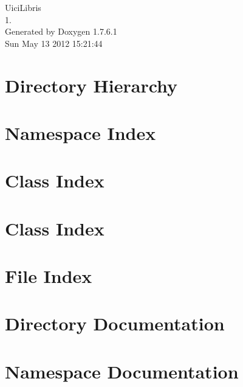 \documentclass[a4paper]{book}
\begin{document}
\hypersetup{pageanchor=false,citecolor=blue}
\begin{titlepage}
\vspace*{7cm}
\begin{center}
{\Large \-Uici\-Libris \\[1ex]\large 1. }\\
\vspace*{1cm}
{\large \-Generated by Doxygen 1.7.6.1}\\
\vspace*{0.5cm}
{\small Sun May 13 2012 15:21:44}\\
\end{center}
\end{titlepage}
\clearemptydoublepage
{}
\tableofcontents
\clearemptydoublepage
{}
\hypersetup{pageanchor=true,citecolor=blue}
\chapter{\-Directory \-Hierarchy}

\chapter{\-Namespace \-Index}

\chapter{\-Class \-Index}

\chapter{\-Class \-Index}

\chapter{\-File \-Index}

\chapter{\-Directory \-Documentation}



\chapter{\-Namespace \-Documentation}



























\end{document}
